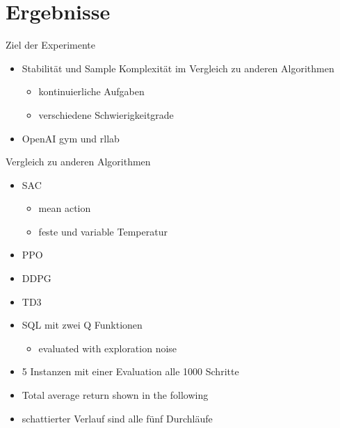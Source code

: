\section{Ergebnisse}


\begin{frame}{Ziel der Experimente}
        \begin{itemize}
            \item Stabilität und Sample Komplexität im Vergleich zu anderen Algorithmen
            \begin{itemize}
                \item kontinuierliche Aufgaben
                \item verschiedene Schwierigkeitgrade
            \end{itemize}  
            \item OpenAI gym und rllab
        \end{itemize}
\end{frame}

\begin{frame}{Vergleich zu anderen Algorithmen}
    \begin{itemize}
        \item SAC
        \begin{itemize}
            \item mean action
            \item feste und variable Temperatur
        \end{itemize} 
        \item PPO
        \item DDPG
        \item TD3
        \item SQL mit zwei Q Funktionen
        \begin{itemize}
            \item evaluated with exploration noise
        
        \end{itemize}
        \item 5 Instanzen mit einer Evaluation alle 1000 Schritte
        \item Total average return shown in the following
        \item schattierter Verlauf sind alle fünf Durchläufe
        
    \end{itemize}
        
\end{frame}

